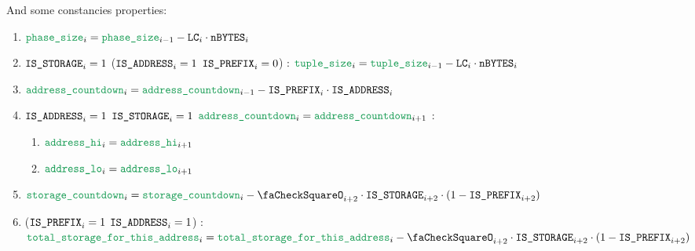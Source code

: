 \begin{enumerate}[resume]
		And some constancies properties:
		\begin{enumerate}
			\item $\locPhaseSize_{i} = \locPhaseSize_{i-1} - \lc_{i} \cdot \limbsize_{i}$
			\item \If $\texttt{IS\_STORAGE}_{i} =1$ \Or ($\texttt{IS\_ADDRESS}_{i} =1$ \et $\texttt{IS\_PREFIX}_{i} =0$) \Then: $\locAccessListTupleSize_{i} = \locAccessListTupleSize_{i-1} - \lc_{i} \cdot \limbsize_{i}$
			\item $\locAddressPrewarmingCountdown_{i} = \locAddressPrewarmingCountdown_{i-1} - \isPrefix_{i} \cdot \isAddr_{i}$
			\item \If $\texttt{IS\_ADDRESS}_{i} =1$ \et $\texttt{IS\_STORAGE}_{i}=1$ \et $\locAddressPrewarmingCountdown_{i} = \locAddressPrewarmingCountdown_{i+1}$ \Then:
				\begin{enumerate}
					\item $\locAddressHi_{i} = \locAddressHi_{i+1}$
					\item $\locAddressLo_{i} = \locAddressLo_{i+1}$
				\end{enumerate}
			\item $\locStoragePrewarmingCountdown_{i} = \locStoragePrewarmingCountdown_{i} - \done_{i+2} \cdot \isSto_{i+2} \cdot (1 - \isPrefix_{i+2})$
			\item \If ($\texttt{IS\_PREFIX}_{i} =1$ \et $\texttt{IS\_ADDRESS}_{i} =1$) \Then: $\locTotStorageForThisAddress_{i} = \locTotStorageForThisAddress_{i} - \done_{i+2} \cdot \isSto_{i+2} \cdot (1 - \isPrefix_{i+2})$
		\end{enumerate}
	\end{enumerate}
